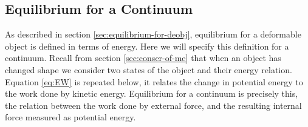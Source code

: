 






\subsection{Equilibrium for a Continuum}
\label{sec:equilibrium-for-a-continuum}
As described in section \vref{sec:equilibrium-for-deobj}, equilibrium
for a deformable object is defined in terms of energy. Here we will
specify this definition for a continuum. Recall from section
\vref{sec:conser-of-me} that when an object has changed shape we
consider two states of the object and their energy relation. Equation
\eqref{eq:EW} is repeated below, it relates the
change in potential energy to the work done by kinetic
energy. Equilibrium for a continuum is precisely this, the relation
between the work done by external force, and the resulting internal
force measured as potential energy.

